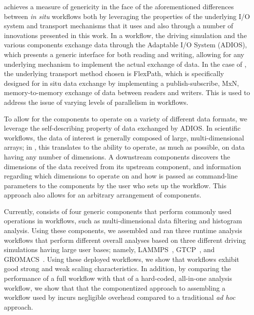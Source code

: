 
\sys achieves a measure of genericity in the face of
the aforementioned differences between
\textit{in situ} workflows both by
leveraging the properties of the underlying I/O
system and transport mechanisms that it uses
and also through a number of
innovations presented in this work.
In a \sys workflow, the driving simulation and the various components
exchange data through the Adaptable I/O System (ADIOS),
which presents a generic interface for both
reading and writing, allowing for any underlying
mechanism to implement the actual exchange of data.
In the case of \sys, the underlying transport method
chosen is FlexPath, which is specifically designed for
in situ data exchange by implementing a publish-subscribe,
MxN, memory-to-memory exchange of data between readers
and writers. This is used to address the issue of
varying levels of parallelism in workflows.

To allow for the \sys components to operate
on a variety of different data formats, we
leverage the self-describing property
of data exchanged by ADIOS.
In scientific workflows, the data of interest
is generally composed of large, multi-dimensional
arrays; in \sys, this translates to
the ability to operate, as much as possible,
on data having any number of dimensions.
A downstream components discovers the dimensions
of the data received from its upstream component,
and information regarding which dimensions to operate
on and how is passed as command-line parameters
to the \sys components by the user who sets up
the workflow. This approach also allows for an
arbitrary arrangement of components.

Currently, \sys consists of four generic components that
perform commonly used operations in workflows, such
as multi-dimensional data filtering and histogram
analysis. Using these components, we assembled
and ran three runtime analysis workflows that perform
different overall analyses
based on three different driving simulations
having large user bases; namely,
LAMMPS~\cite{plimpton:1997:lammps},
GTCP~\cite{lin:gtc},
and GROMACS~\cite{hess2008gromacs}.
Using these deployed workflows,
we show that \sys workflows exhibit
good strong and weak scaling characteristics.
In addition, by comparing the performance
of a full \sys workflow with that of a
hard-coded, all-in-one analysis workflow,
we show that that the componentized approach to
assembling a workflow used by \sys
incurs negligible overhead compared
to a traditional \textit{ad hoc} approach.

